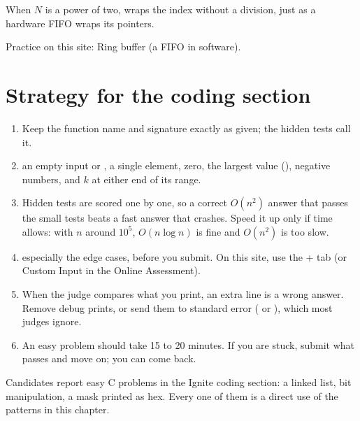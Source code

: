 When $N$ is a power of two,  wraps the index without a division, just as a hardware FIFO wraps its pointers.

Practice on this site: Ring buffer (a FIFO in software).

\section{Strategy for the coding section}

\begin{enumerate}
  \item {} Keep the function name and signature exactly as given; the hidden tests call it.
  \item {} an empty input or , a single element, zero, the largest value (), negative numbers, and $k$ at either end of its range.
  \item {} Hidden tests are scored one by one, so a correct $O(n^2)$ answer that passes the small tests beats a fast answer that crashes. Speed it up only if time allows: with $n$ around $10^5$, $O(n \log n)$ is fine and $O(n^2)$ is too slow.
  \item {} especially the edge cases, before you submit. On this site, use the + tab (or Custom Input in the Online Assessment).
  \item {} When the judge compares what you print, an extra line is a wrong answer. Remove debug prints, or send them to standard error ( or ), which most judges ignore.
  \item {} An easy problem should take 15 to 20 minutes. If you are stuck, submit what passes and move on; you can come back.
\end{enumerate}

\begin{onoa}
Candidates report easy C problems in the Ignite coding section: a linked list, bit manipulation, a mask printed as hex. Every one of them is a direct use of the patterns in this chapter.
\end{onoa}
